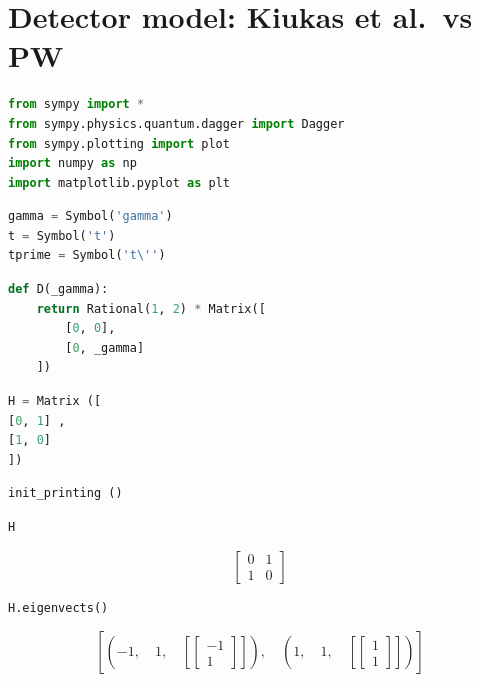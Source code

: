 \hypertarget{detector-model-kiukas-et-al.vs-pw}{%
\section{Detector model: Kiukas et al.~vs
PW}\label{detector-model-kiukas-et-al.vs-pw}}

\begin{lstlisting}[language=Python]
from sympy import *
from sympy.physics.quantum.dagger import Dagger
from sympy.plotting import plot
import numpy as np
import matplotlib.pyplot as plt
\end{lstlisting}

\begin{lstlisting}[language=Python]
gamma = Symbol('gamma')
t = Symbol('t')
tprime = Symbol('t\'')
\end{lstlisting}

\begin{lstlisting}[language=Python]
def D(_gamma):
    return Rational(1, 2) * Matrix([
        [0, 0],
        [0, _gamma]
    ])
\end{lstlisting}

\begin{lstlisting}[language=Python]
H = Matrix ([
[0, 1] ,
[1, 0]
])
\end{lstlisting}

\begin{lstlisting}[language=Python]
init_printing ()
\end{lstlisting}

\begin{lstlisting}[language=Python]
H
\end{lstlisting}

\[\left[\begin{matrix}0 & 1\\1 & 0\end{matrix}\right]\]

\begin{lstlisting}[language=Python]
H.eigenvects()
\end{lstlisting}

\[\left [ \left ( -1, \quad 1, \quad \left [ \left[\begin{matrix}-1\\1\end{matrix}\right]\right ]\right ), \quad \left ( 1, \quad 1, \quad \left [ \left[\begin{matrix}1\\1\end{matrix}\right]\right ]\right )\right ]\]

